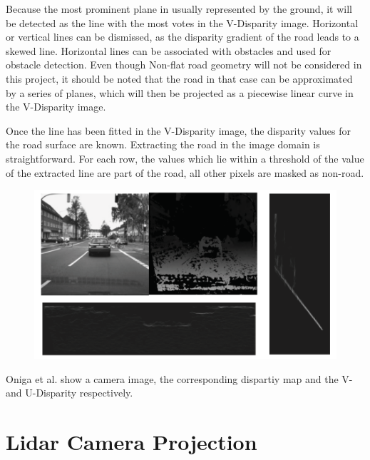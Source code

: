 \newline

Because the most prominent plane in usually represented by the ground, it will be detected as the line with the most votes in the V-Disparity image. Horizontal or vertical lines can be dismissed, as the disparity gradient of the road leads to a skewed line.
Horizontal lines can be associated with obstacles and used for obstacle detection.
Even though Non-flat road geometry will not be considered in this project, it should be noted that the road in that case can be approximated by a series of planes, which will then be projected as a piecewise linear curve in the V-Disparity image.

Once the line has been fitted in the V-Disparity image, the disparity values for the road surface are known. Extracting the road in the image domain is straightforward. For each row, the values which lie within a threshold of the value of the extracted line are part of the road, all other pixels are masked as non-road.

\begin{figure}
	\centering
	\includegraphics[width=0.7\linewidth]{Figures/vdisp}
	\caption[Overview of V-Disparity method]{}
	\label{fig:vdisp}
\end{figure}

Oniga et al. \cite{Oniga2015} show a camera image, the corresponding dispartiy map and the V- and U-Disparity respectively.



\section{Lidar Camera Projection}

